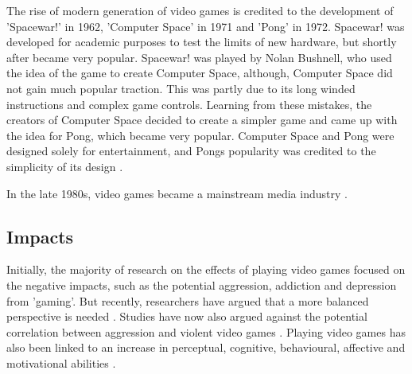 \documentclass[a4paper,11.5pt]{report}
\numberwithin{figure}{section}
\numberwithin{table}{section}
\numberwithin{equation}{section}
\numberwithin{equation}{section}
\begin{document}

The rise of modern generation of video games is credited to the development of 'Spacewar!' in 1962, 'Computer Space' in 1971 and 'Pong' in 1972. Spacewar! was developed for academic purposes to test the limits of new hardware, but shortly after became very popular. Spacewar! was played by Nolan Bushnell, who used the idea of the game to create Computer Space, although, Computer Space did not gain much popular traction. This was partly due to its long winded instructions and complex game controls. Learning from these mistakes, the creators of Computer Space decided to create a simpler game and came up with the idea for Pong, which became very popular. Computer Space and Pong were designed solely for entertainment, and Pongs popularity was credited to the simplicity of its design \citep{Lowood2009}.



In the late 1980s, video games became a mainstream media industry \citep{Dmitri2003}.

\subsection{Impacts}


Initially, the majority of research on the effects of playing video games focused on the negative impacts, such as the potential aggression, addiction and depression from 'gaming'. But recently, researchers have argued that a more balanced perspective is needed \citep{Granic2014}. Studies have now also argued against the potential correlation between aggression and violent video games \citep{Ferguson2007}. Playing video games has also been linked to an increase in  perceptual, cognitive, behavioural, affective and motivational abilities \citep{Connolly2012}.
\end{document}
